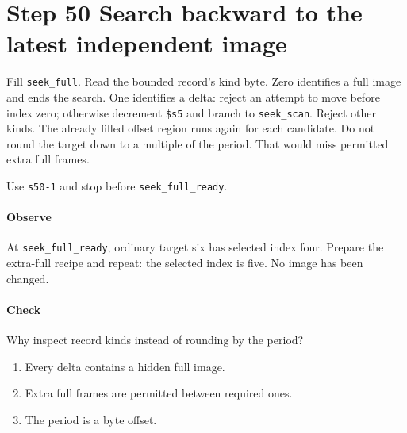 \section{Step 50 Search backward to the latest independent image}
Fill \texttt{seek\_full}. Read the bounded record's kind byte. Zero identifies a full image and ends the search. One identifies a delta: reject an attempt to move before index zero; otherwise decrement \texttt{\$s5} and branch to \texttt{seek\_scan}. Reject other kinds. The already filled offset region runs again for each candidate. Do not round the target down to a multiple of the period. That would miss permitted extra full frames.

Use \texttt{s50-1} and stop before \texttt{seek\_full\_ready}.

\paragraph{Observe} At \texttt{seek\_full\_ready}, ordinary target six has selected index four. Prepare the extra-full recipe and repeat: the selected index is five. No image has been changed.

\paragraph{Check} Why inspect record kinds instead of rounding by the period?
\begin{enumerate}[label=\Alph*.]
\item Every delta contains a hidden full image.
\item Extra full frames are permitted between required ones.
\item The period is a byte offset.
\end{enumerate}
